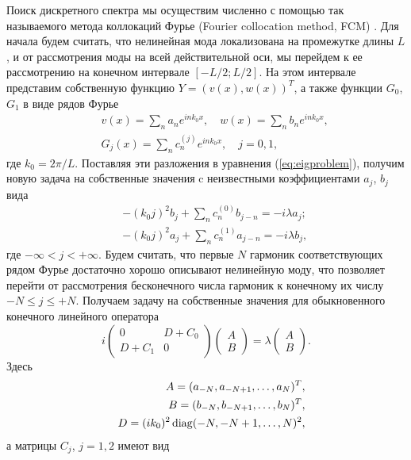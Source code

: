 Поиск дискретного спектра мы осуществим численно с помощью так называемого метода коллокаций Фурье (Fourier collocation method, FCM) \cite{JYang}.
Для начала будем считать, что нелинейная мода локализована на промежутке длины $L$, и от рассмотрения моды на всей действительной оси, мы перейдем к ее рассмотрению на конечном интервале $[-L/2; L/2]$.
На этом интервале представим собственную функцию $Y = (v(x), w(x))^T$, а также функции $G_0$, $G_1$ в виде рядов Фурье
%
\begin{eqnarray}
&& v(x) = \sum \limits_n a_n e^{i n k_0 x}, \quad w(x) = \sum \limits_n b_n e^{i n k_0 x}, \\
&& G_j(x) = \sum \limits_n c_n^{(j)} e^{i n k_0 x}, \quad j = 0, 1,
\end{eqnarray}
%
где $k_0 = 2 \pi / L$.
Поставляя эти разложения в уравнения (\ref{eq:eigproblem}), получим новую задача на собственные значения c неизвестными коэффициентами $a_j$, $b_j$ вида
%
\begin{eqnarray}
&& -(k_0 j)^2 b_j + \sum \limits_n c_n^{(0)} b_{j-n} = -i \lambda a_j; \\
&& -(k_0 j)^2 a_j + \sum \limits_n c_n^{(1)} a_{j-n} = -i \lambda b_j,
\end{eqnarray}
%
где $-\infty < j < +\infty$.
Будем считать, что первые $N$ гармоник соответствующих рядом Фурье достаточно хорошо описывают нелинейную моду, что позволяет перейти от рассмотрения бесконечного числа гармоник к конечному их числу $-N \le j \le +N$.
Получаем задачу на собственные значения для обыкновенного конечного линейного оператора
%
\begin{equation}
i \begin{pmatrix}
0 & D + C_0 \\
D + C_1 & 0
\end{pmatrix}
\begin{pmatrix}
A \\ B
\end{pmatrix}
= \lambda
\begin{pmatrix}
A \\ B
\end{pmatrix}.
\label{eq:eigproblem_alg}
\end{equation}
%
Здесь
%
\begin{eqnarray}
&& A = (a_{-N}, a_{-N+1}, \dots, a_N)^T, \\
&& B = (b_{-N}, b_{-N+1}, \dots, b_N)^T, \\
&& D = (i k_0)^2 \mathop{\mathrm{diag}}(-N, -N+1, \dots, N)^2, 
\end{eqnarray}
%
а матрицы $C_j$, $j = 1,2$ имеют вид
